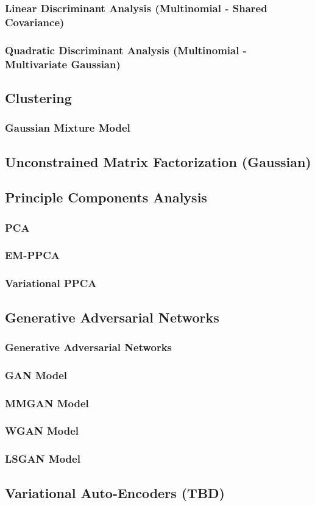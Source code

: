 \subsubsection{Linear Discriminant Analysis (Multinomial - Shared Covariance)}
\subsubsection{Quadratic Discriminant Analysis (Multinomial - Multivariate Gaussian)}

\subsection{Clustering}
\subsubsection{Gaussian Mixture Model}

\subsection{Unconstrained Matrix Factorization (Gaussian)}

\subsection{Principle Components Analysis}
\subsubsection{PCA}
\subsubsection{EM-PPCA}
\subsubsection{Variational PPCA}

\subsection{Generative Adversarial Networks}
\subsubsection{Generative Adversarial Networks}
\subsubsection{GAN Model}
\subsubsection{MMGAN Model}
\subsubsection{WGAN Model}
\subsubsection{LSGAN Model}

\subsection{Variational Auto-Encoders (TBD)}
